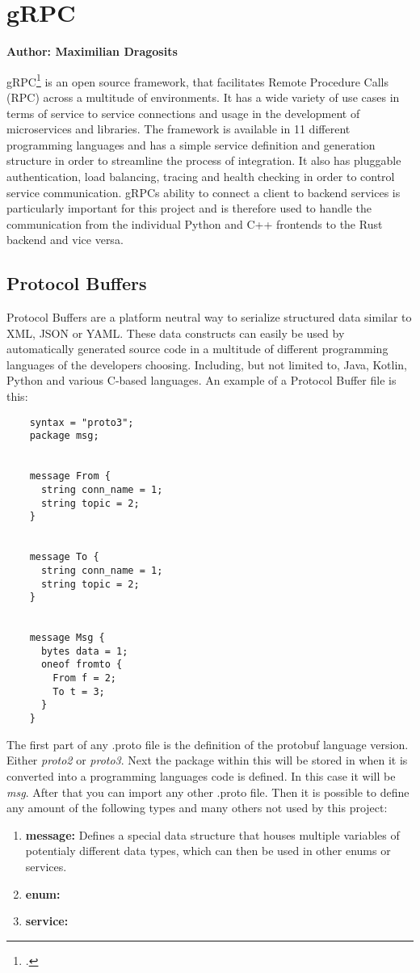 \section{gRPC}
\textbf{Author: Maximilian Dragosits}

gRPC\footcite{grpc_main_site} is an open source framework, that facilitates Remote Procedure Calls (RPC) across a multitude of environments. It has a wide variety of use cases in terms of
service to service connections and usage in the development of microservices and libraries. The framework is available in 11 different programming languages and 
has a simple service definition and generation structure in order to streamline the process of integration. It also has pluggable authentication, load balancing, tracing
and health checking in order to control service communication. gRPCs ability to connect a client to backend services is particularly important for this project 
and is therefore used to handle the communication from the individual Python and C++ frontends to the Rust backend and vice versa.

\subsection{Protocol Buffers}

Protocol Buffers are a platform neutral way to serialize structured data similar to XML, JSON or YAML. These data constructs can easily be used by automatically
generated source code in a multitude of different programming languages of the developers choosing. Including, but not limited to, Java, Kotlin, Python and various
C-based languages. An example of a Protocol Buffer file is this:

\begin{verbatim}
    syntax = "proto3";
    package msg;
    
    
    message From {
      string conn_name = 1;
      string topic = 2;
    }
    
    
    message To {
      string conn_name = 1;
      string topic = 2;
    }
    
    
    message Msg {
      bytes data = 1;
      oneof fromto {
        From f = 2;
        To t = 3;
      }
    }
\end{verbatim}

The first part of any .proto file is the definition of the protobuf language version. Either \textit{proto2} or \textit{proto3}. Next the package within this will be 
stored in when it is converted into a programming languages code is defined. In this case it will be \textit{msg}. After that you can import any other .proto file.
Then it is possible to define any amount of the following types and many others not used by this project:
\begin{enumerate}
    \item \textbf{message:} Defines a special data structure that houses multiple variables of potentialy different data types, which can then be used in other enums or services.
    \item \textbf{enum:} %
    \item \textbf{service:} %
\end{enumerate}

